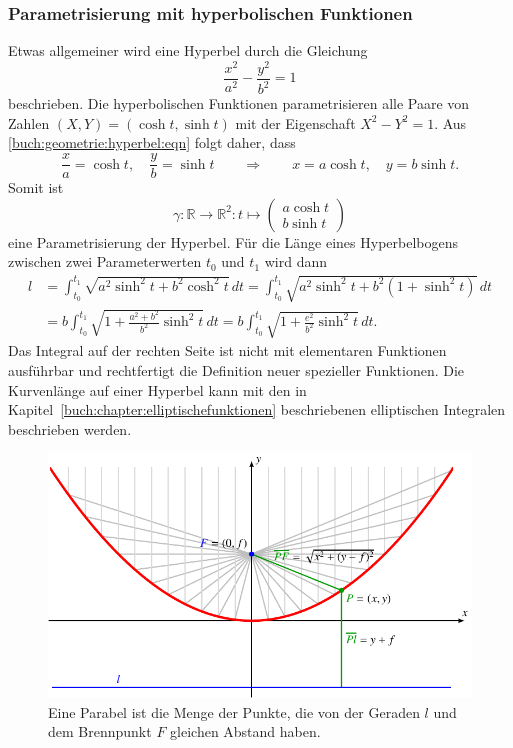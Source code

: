 \subsubsection{Parametrisierung mit hyperbolischen Funktionen}
Etwas allgemeiner wird eine Hyperbel durch die Gleichung
\begin{equation}
\frac{x^2}{a^2} - \frac{y^2}{b^2} = 1
\label{buch:geometrie:hyperbel:eqn}
\end{equation}
beschrieben.
Die hyperbolischen Funktionen parametrisieren alle Paare von Zahlen
$(X,Y)=(\cosh t,\sinh t)$ mit der Eigenschaft $X^2-Y^2=1$.
Aus \eqref{buch:geometrie:hyperbel:eqn} folgt daher, dass
\[
\frac{x}{a} = \cosh t,\quad \frac{y}{b} = \sinh t
\qquad\Rightarrow\qquad
x=a\cosh t,\quad y=b\sinh t.
\]
Somit ist 
\[
\gamma\colon
\mathbb{R}\to\mathbb{R}^2
:
t\mapsto \begin{pmatrix}a\cosh t\\b\sinh t\end{pmatrix}
\]
eine Parametrisierung der Hyperbel.
Für die Länge eines Hyperbelbogens zwischen zwei Parameterwerten
$t_0$ und $t_1$ wird dann
\begin{align*}
l
&=
\int_{t_0}^{t_1}
\sqrt{a^2 \sinh^2 t + b^2 \cosh^2 t}
\,dt
=
\int_{t_0}^{t_1}
\sqrt{a^2 \sinh^2 t + b^2 (1+\sinh^2 t)}
\,dt
\\
&=
b
\int_{t_0}^{t_1}
\sqrt{1 + \frac{a^2+b^2}{b^2} \sinh^2 t }
\,dt
=
b
\int_{t_0}^{t_1}
\sqrt{1 + \frac{e^2}{b^2} \sinh^2 t }
\,dt.
\end{align*}
Das Integral auf der rechten Seite ist nicht mit elementaren Funktionen
ausführbar und rechtfertigt die Definition neuer spezieller Funktionen.
Die Kurvenlänge auf einer Hyperbel kann mit den in
Kapitel~\ref{buch:chapter:elliptischefunktionen}
beschriebenen elliptischen Integralen beschrieben werden.
\begin{figure}
\centering
\includegraphics{chapters/030-geometrie/images/parabel.pdf}
\caption{Eine Parabel ist die Menge der Punkte, die von der Geraden $l$
und dem Brennpunkt $F$ gleichen Abstand haben.
\label{buch:geometrie:fig:parabel}}
\end{figure}

